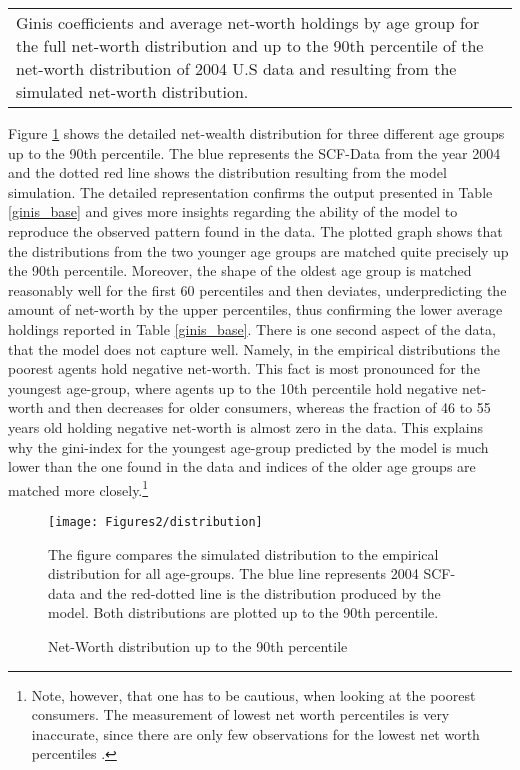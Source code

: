 \documentclass[a4paper,12pt,legno]{article}
\begin{document}
\begin{table}[!htbp]
\begin{tabular}{@{}lll@{}}
\multicolumn{3}{l}{%
  \begin{minipage}{8.5cm}%
    \small Ginis coefficients and average net-worth holdings by age group for the full net-worth distribution and up to the 90th percentile of the net-worth distribution of 2004 U.S data and resulting from the simulated net-worth distribution. 
  \end{minipage}%
}\\
\end{tabular}
\end{table}

Figure \ref{wealth_distr_base} shows the detailed net-wealth distribution for three different age groups up to the 90th percentile. The blue represents the SCF-Data from the year 2004 and the dotted red line shows the distribution resulting from the model simulation. The detailed representation confirms the output presented in Table \ref{ginis_base} and gives more insights regarding the ability of the model to reproduce the observed pattern found in the data.
The plotted graph shows that the distributions from the two younger age groups are matched quite precisely up the 90th percentile. Moreover, the shape of the oldest age group is matched reasonably well for the first 60 percentiles and then deviates, underpredicting the amount of net-worth by the upper percentiles, thus confirming the lower average holdings reported in Table \ref{ginis_base}. There is one second aspect of the data, that the model does not capture well. Namely, in the empirical distributions the poorest agents hold negative net-worth. This fact is most pronounced for the youngest age-group, where agents up to the 10th percentile hold negative net-worth and then decreases for older consumers, whereas the fraction of 46 to 55 years old holding negative net-worth is almost zero in the data. This explains why the gini-index for the youngest age-group predicted by the model is much lower than the one found in the data and indices of the older age groups are matched more closely.\footnote{Note, however, that one has to be cautious, when looking at the poorest consumers. The measurement of lowest net worth percentiles is very inaccurate, since there are only few observations for the lowest net worth percentiles \citep{hintermaier2011}.} 
\begin{figure}[!htbp]
\caption{Net-Worth distribution up to the 90th percentile} 
\label{wealth_distr_base}	%
\centering
\texttt{[image: Figures2/distribution]}  %

\begin{minipage}{0.8\linewidth}
\footnotesize{The figure compares the simulated distribution to the empirical distribution for all age-groups. The blue line represents 2004 SCF-data and the red-dotted line is the distribution produced by the model. Both distributions are plotted up to the 90th percentile.}
\end{minipage}

\end{figure}
\end{document}
